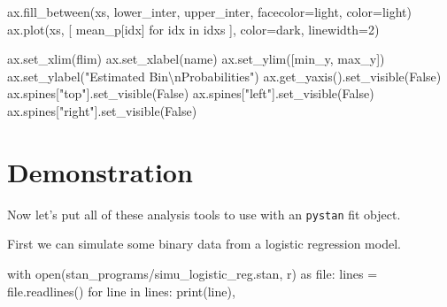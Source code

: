 \documentclass[
  letterpaper,
  DIV=11,
  numbers=noendperiod]{scrartcl}
\newenvironment{Shaded}{\begin{snugshade}}{\end{snugshade}}
\newcommand{\BuiltInTok}[1]{\textcolor[rgb]{0.00,0.23,0.31}{#1}}
\newcommand{\CharTok}[1]{\textcolor[rgb]{0.13,0.47,0.30}{#1}}
\newcommand{\ControlFlowTok}[1]{\textcolor[rgb]{0.00,0.23,0.31}{#1}}
\newcommand{\DecValTok}[1]{\textcolor[rgb]{0.68,0.00,0.00}{#1}}
\newcommand{\ImportTok}[1]{\textcolor[rgb]{0.00,0.46,0.62}{#1}}
\newcommand{\KeywordTok}[1]{\textcolor[rgb]{0.00,0.23,0.31}{#1}}
\newcommand{\NormalTok}[1]{\textcolor[rgb]{0.00,0.23,0.31}{#1}}
\newcommand{\OperatorTok}[1]{\textcolor[rgb]{0.37,0.37,0.37}{#1}}
\newcommand{\StringTok}[1]{\textcolor[rgb]{0.13,0.47,0.30}{#1}}
\newcommand{\VariableTok}[1]{\textcolor[rgb]{0.07,0.07,0.07}{#1}}
\begin{document}
\begin{Shaded}
\begin{Highlighting}[]
\NormalTok{  ax.fill\_between(xs, lower\_inter, upper\_inter,}
\NormalTok{                    facecolor}\OperatorTok{=}\NormalTok{light, color}\OperatorTok{=}\NormalTok{light)}
\NormalTok{  ax.plot(xs, [ mean\_p[idx] }\ControlFlowTok{for}\NormalTok{ idx }\KeywordTok{in}\NormalTok{ idxs ], color}\OperatorTok{=}\NormalTok{dark, linewidth}\OperatorTok{=}\DecValTok{2}\NormalTok{)}
  
\NormalTok{  ax.set\_xlim(flim)}
\NormalTok{  ax.set\_xlabel(name)}
\NormalTok{  ax.set\_ylim([min\_y, max\_y])}
\NormalTok{  ax.set\_ylabel(}\StringTok{"Estimated Bin}\CharTok{\textbackslash{}n}\StringTok{Probabilities"}\NormalTok{)}
\NormalTok{  ax.get\_yaxis().set\_visible(}\VariableTok{False}\NormalTok{)}
\NormalTok{  ax.spines[}\StringTok{"top"}\NormalTok{].set\_visible(}\VariableTok{False}\NormalTok{)}
\NormalTok{  ax.spines[}\StringTok{"left"}\NormalTok{].set\_visible(}\VariableTok{False}\NormalTok{)}
\NormalTok{  ax.spines[}\StringTok{"right"}\NormalTok{].set\_visible(}\VariableTok{False}\NormalTok{)}
\end{Highlighting}
\end{Shaded}

\hypertarget{demonstration}{%
\section{Demonstration}\label{demonstration}}

Now let's put all of these analysis tools to use with an \texttt{pystan}
fit object.

First we can simulate some binary data from a logistic regression model.

\begin{Shaded}
\begin{Highlighting}[]
\ControlFlowTok{with} \BuiltInTok{open}\NormalTok{(}\StringTok{\textquotesingle{}stan\_programs/simu\_logistic\_reg.stan\textquotesingle{}}\NormalTok{, }\StringTok{\textquotesingle{}r\textquotesingle{}}\NormalTok{) }\ImportTok{as} \BuiltInTok{file}\NormalTok{:}
\NormalTok{  lines }\OperatorTok{=} \BuiltInTok{file}\NormalTok{.readlines()}
  \ControlFlowTok{for}\NormalTok{ line }\KeywordTok{in}\NormalTok{ lines:}
    \BuiltInTok{print}\NormalTok{(line),}
\end{Highlighting}
\end{Shaded}
\end{document}
